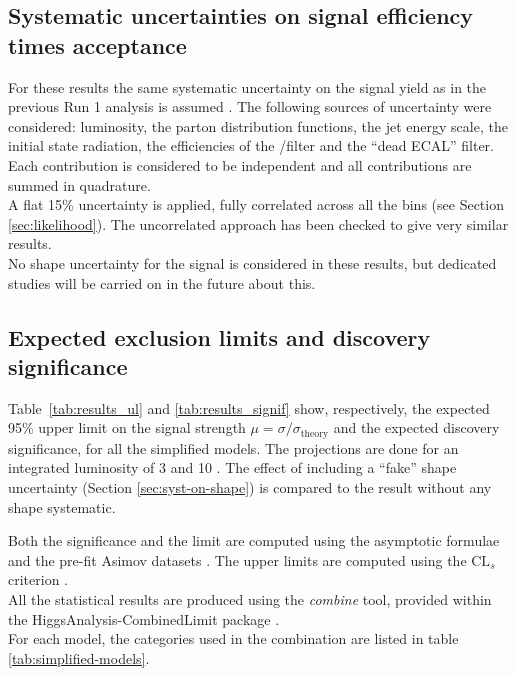 \subsection{Systematic uncertainties on signal efficiency times acceptance}
\label{sec:sig-syst}

For these results the same systematic uncertainty on the signal yield 
as in the previous Run 1 analysis is assumed \cite{CMS_AN_2013-366}. 
The following sources of uncertainty were considered: 
luminosity, the parton distribution
functions, the jet energy scale, the initial state radiation, the
efficiencies of the \mht/\met filter and the ``dead ECAL'' filter. 
Each contribution is considered to be independent and all contributions are
summed in quadrature. \\
A flat 15\% uncertainty is applied, fully correlated across all the bins (see Section \ref{sec:likelihood}). 
The uncorrelated approach has been checked to give very similar results. \\
No shape uncertainty for the signal is considered in these results, 
but dedicated studies will be carried on in the future about this.


\subsection{Expected exclusion limits and discovery significance}
\label{subsec:susy_results}

Table~\ref{tab:results_ul} and \ref{tab:results_signif} show, respectively, 
the expected 95\% upper limit on the signal strength $\mu=\sigma/\sigma_{\mathrm{theory}}$ 
and the expected discovery significance, for all the simplified models. 
The projections are done for an integrated luminosity of 3 and 10 \ifb. 
The effect of including a ``fake'' shape uncertainty (Section \ref{sec:syst-on-shape}) is compared to the result without any shape systematic.  

Both the significance and the limit are computed using the asymptotic formulae and the pre-fit Asimov datasets \cite{AsymptoticFormulae}. 
The upper limits are computed using the $\text{CL}_{s}$ criterion \cite{CLsTechnique}. \\
All the statistical results are produced using the \textit{combine} tool, 
provided within the HiggsAnalysis-CombinedLimit package \cite{Combine}. \\
For each model, the categories used in the combination are listed in table \ref{tab:simplified-models}. 

